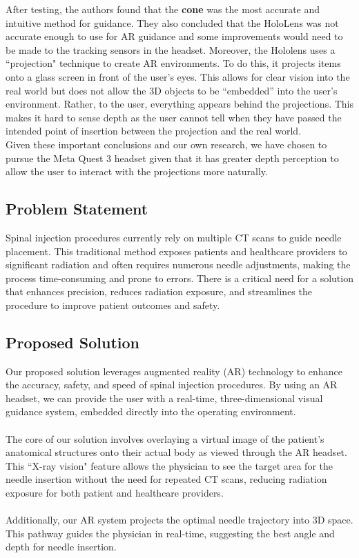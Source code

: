 \documentclass[12pt]{article}
\begin{document}
After testing, the authors found that the \textbf{cone} was the most accurate and intuitive method for guidance. They also concluded that the HoloLens was not accurate enough to use for AR guidance and some improvements would need to be made to the tracking sensors in the headset. Moreover, the Hololens uses a ``projection" technique to create AR environments. To do this, it projects items onto a glass screen in front of the user's eyes. This allows for clear vision into the real world but does not allow the 3D objects to be ``embedded'' into the user's environment. Rather, to the user, everything appears behind the projections. This makes it hard to sense depth as the user cannot tell when they have passed the intended point of insertion between the projection and the real world.\\

Given these important conclusions and our own research, we have chosen to pursue the Meta Quest 3 headset given that it has greater depth perception to allow the user to interact with the projections more naturally.

\subsection{Problem Statement}
Spinal injection procedures currently rely on multiple CT scans to guide needle placement. This traditional method exposes patients and healthcare providers to significant radiation and often requires numerous needle adjustments, making the process time-consuming and prone to errors. There is a critical need for a solution that enhances precision, reduces radiation exposure, and streamlines the procedure to improve patient outcomes and safety. 

\subsection{Proposed Solution}
\label{sec:ProposedSolution}
Our proposed solution leverages augmented reality (AR) technology to enhance the accuracy, safety, and speed of spinal injection procedures. By using an AR headset, we can provide the user with a real-time, three-dimensional visual guidance system, embedded directly into the operating environment.\\
\\
The core of our solution involves overlaying a virtual image of the patient’s anatomical structures onto their actual body as viewed through the AR headset. This ``X-ray vision" feature allows the physician to see the target area for the needle insertion without the need for repeated CT scans, reducing radiation exposure for both patient and healthcare providers.\\
\\
Additionally, our AR system projects the optimal needle trajectory into 3D space. This pathway guides the physician in real-time, suggesting the best angle and depth for needle insertion.
\end{document}
